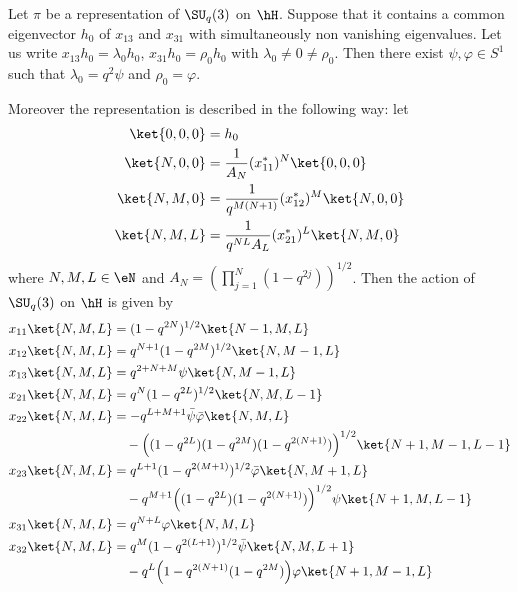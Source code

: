 \begin{theorem}     \label{ThoRepresSUqtnz}
    Let \( \pi\) be a representation of \( \SU_q(3)\) on \( \hH\). Suppose that it contains a common eigenvector \( h_0\) of \( x_{13}\) and \( x_{31}\) with simultaneously non vanishing eigenvalues. Let us write \( x_{13}h_0=\lambda_0h_0\), \( x_{31}h_0=\rho_0h_0\) with \( \lambda_0\neq 0\neq\rho_0\). Then there exist \( \psi, \varphi\in S^1\) such that \( \lambda_0=q^2\psi\) and \( \rho_0=\varphi\).

    Moreover the representation is described in the following way: let 
    \begin{subequations}
        \begin{align}
            \ket{0,0,0}&=h_0\\
            \ket{N,0,0}&=\frac{1}{ A_N }(x_{11}^*)^N\ket{0,0,0}\\
            \ket{N,M,0}&=\frac{1}{ q^{M(N+1)} }(x_{12}^*)^M\ket{N,0,0}\\
            \ket{N,M,L}&=\frac{1}{ q^{NL}A_L }(x_{21}^*)^L\ket{N,M,0}
        \end{align}
    \end{subequations}
    where \( N,M,L\in\eN\) and \( A_N=\left( \prod_{j=1}^N(1-q^{2j})\right)^{1/2}\). Then the action of \( \SU_q(3)\) on \( \hH\) is given by
    \begin{subequations}
        \begin{align}
            x_{11}\ket{N,M,L}&=(1-q^{2N})^{1/2}\ket{N-1,M,L}        \label{subeqxijNMLa}\\
            x_{12}\ket{N,M,L}&=q^{N+1}(1-q^{2M})^{1/2}\ket{N,M-1,L}\\
            x_{13}\ket{N,M,L}&=q^{2+N+M}\psi\ket{N,M-1,L}\\
            x_{21}\ket{N,M,L}&=q^N(1-q^{2L})^{1/2}\ket{N,M,L-1}\\
            x_{22}\ket{N,M,L}&=-q^{L+M+1}\bar\psi\bar\varphi\ket{N,M,L}\\
                &\quad-\Big( (1-q^{2L})(1-q^{2M})(1-q^{2(N+1)}) \Big)^{1/2}\ket{N+1,M-1,L-1}\\
            x_{23}\ket{N,M,L}&=q^{L+1}(1-q^{2(M+1)})^{1/2}\bar\varphi\ket{N,M+1,L}\\
            &\quad-q^{M+1}\Big( (1-q^{2L})(1-q^{2(N+1)}) \Big)^{1/2}\psi\ket{N+1,M,L-1}\\
            x_{31}\ket{N,M,L}&=q^{N+L}\varphi\ket{N,M,L}\\
            x_{32}\ket{N,M,L}&=q^M(1-q^{2(L+1)})^{1/2}\bar\psi\ket{N,M,L+1}\\&\quad-q^L\Big( 1-q^{2(N+1)}(1-q^{2M}) \Big)\varphi\ket{N+1,M-1,L}\\

\end{align}
\end{subequations}
\end{theorem}

